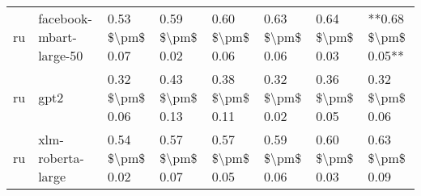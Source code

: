 \begin{tabular}{llllllll}
      ru &            facebook-mbart-large-50 & 0.53 \$\textbackslash pm\$ 0.07 &           0.59 \$\textbackslash pm\$ 0.02 &       0.60 \$\textbackslash pm\$ 0.06 &        0.63 \$\textbackslash pm\$ 0.06 &                         0.64 \$\textbackslash pm\$ 0.03 & **0.68 \$\textbackslash pm\$ 0.05** \\
      ru &                               gpt2 & 0.32 \$\textbackslash pm\$ 0.06 &           0.43 \$\textbackslash pm\$ 0.13 &       0.38 \$\textbackslash pm\$ 0.11 &        0.32 \$\textbackslash pm\$ 0.02 &                         0.36 \$\textbackslash pm\$ 0.05 &     0.32 \$\textbackslash pm\$ 0.06 \\
      ru &                  xlm-roberta-large & 0.54 \$\textbackslash pm\$ 0.02 &           0.57 \$\textbackslash pm\$ 0.07 &       0.57 \$\textbackslash pm\$ 0.05 &        0.59 \$\textbackslash pm\$ 0.06 &                         0.60 \$\textbackslash pm\$ 0.03 &     0.63 \$\textbackslash pm\$ 0.09 \\
\bottomrule
\end{tabular}

